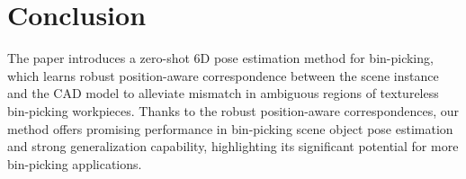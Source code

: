 \section{Conclusion}
\label{sec:conclusion}
The paper introduces a zero-shot 6D pose estimation method for bin-picking, which learns robust position-aware correspondence between the scene instance and the CAD model to alleviate mismatch in ambiguous regions of textureless bin-picking workpieces.
Thanks to the robust position-aware correspondences, our method offers promising performance in bin-picking scene object pose estimation and strong generalization capability, highlighting its significant potential for more bin-picking applications.  

